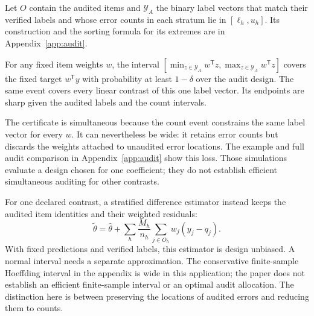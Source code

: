 Let $O$ contain the audited items and $\mathcal Y_A$ the binary label vectors
that match their verified labels and whose error counts in each stratum lie
in $[\ell_h,u_h]$. Its construction and the sorting formula for its extremes
are in Appendix~\ref{app:audit}.
\begin{proposition}\label{prop:audit}
For any fixed item weights $w$, the interval
$[\min_{z\in\mathcal Y_A}w^{\mathsf T}z,
  \max_{z\in\mathcal Y_A}w^{\mathsf T}z]$
covers the fixed target $w^{\mathsf T}y$ with probability at least
$1-\delta$ over the audit design. The same event covers every linear contrast
of this one label vector. Its endpoints are sharp given the audited labels
and the count intervals.
\end{proposition}
The certificate is simultaneous because the count event constrains the same
label vector for every $w$. It can nevertheless be wide: it retains error
counts but discards the weights attached to unaudited error locations.
The example and full audit comparison in Appendix~\ref{app:audit} show this
loss. Those simulations evaluate a design chosen for one coefficient; they
do not establish efficient simultaneous auditing for other contrasts.

For one declared contrast, a stratified difference estimator instead keeps
the audited item identities and their weighted residuals:
\begin{equation}\label{eq:directaudit}
 \widetilde\theta=\widehat\theta+
 \sum_h\frac{M_h}{n_h}\sum_{j\in O_h}w_j(y_j-q_j).
\end{equation}
With fixed predictions and verified labels, this estimator is design
unbiased. A normal interval needs a separate approximation. The conservative
finite-sample Hoeffding interval in the appendix is wide in this application;
the paper does not establish an efficient finite-sample interval or an
optimal audit allocation. The distinction here is between preserving the
locations of audited errors and reducing them to counts.

